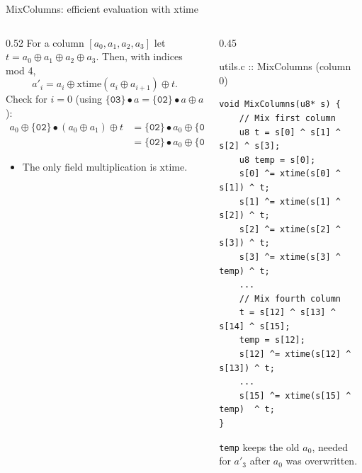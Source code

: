 \documentclass[aspectratio=169,10pt]{beamer}
\newcommand{\xor}{\oplus}
\newcommand{\gm}{\bullet}                       %
\newcommand{\fn}[1]{\mathrm{#1}}
\newcommand{\hx}[1]{\ensuremath{\mathtt{\{#1\}}}}            %
\begin{document}
\begin{frame}[fragile]{MixColumns: efficient evaluation with xtime}
\begin{columns}[T]
\begin{column}{0.52\textwidth}
\small
For a column $[a_0,a_1,a_2,a_3]$ let $t=a_0\xor a_1\xor a_2\xor a_3$.
Then, with indices mod 4,
\[ a'_i=a_i\xor\fn{xtime}(a_i\xor a_{i+1})\xor t. \]
\footnotesize
Check for $i=0$ (using $\hx{03}\gm a=\hx{02}\gm a\xor a$):
\begin{align*}
a_0\xor\hx{02}\gm(a_0\xor a_1)\xor t
&=\hx{02}\gm a_0\xor\hx{02}\gm a_1\xor a_1\xor a_2\xor a_3\\
&=\hx{02}\gm a_0\xor\hx{03}\gm a_1\xor a_2\xor a_3 .
\end{align*}
\begin{itemize}
\item The \alert{only} field multiplication is $\fn{xtime}$.
\end{itemize}
\end{column}
\begin{column}{0.45\textwidth}
\begin{tbox}{utils.c :: MixColumns (column 0)}
\begin{lstlisting}
void MixColumns(u8* s) {
    // Mix first column
    u8 t = s[0] ^ s[1] ^ s[2] ^ s[3];
    u8 temp = s[0];
    s[0] ^= xtime(s[0] ^ s[1]) ^ t;
    s[1] ^= xtime(s[1] ^ s[2]) ^ t;
    s[2] ^= xtime(s[2] ^ s[3]) ^ t;
    s[3] ^= xtime(s[3] ^ temp) ^ t;
    ...
    // Mix fourth column
    t = s[12] ^ s[13] ^ s[14] ^ s[15];
    temp = s[12];
    s[12] ^= xtime(s[12] ^ s[13]) ^ t;
    ...
    s[15] ^= xtime(s[15] ^ temp)  ^ t;
}
\end{lstlisting}
\end{tbox}
\vskip3pt
{\footnotesize \texttt{temp} keeps the old $a_0$, needed for $a'_3$ after $a_0$ was overwritten.}
\end{column}
\end{columns}
\end{frame}
\end{document}
